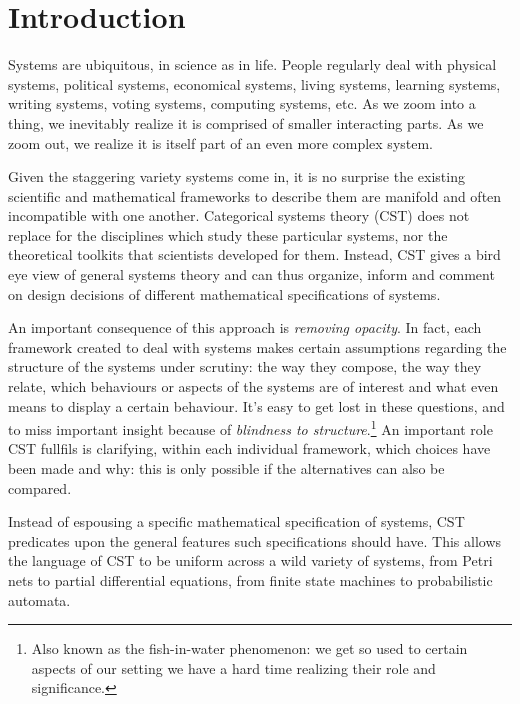 
\section{Introduction}
Systems are ubiquitous, in science as in life.
People regularly deal with physical systems, political systems, economical systems, living systems, learning systems, writing systems, voting systems, computing systems, etc.
As we zoom into a thing, we inevitably realize it is comprised of smaller interacting parts. As we zoom out, we realize it is itself part of an even more complex system.

Given the staggering variety systems come in, it is no surprise the existing scientific and mathematical frameworks to describe them are manifold and often incompatible with one another.
Categorical systems theory (CST) does not replace for the disciplines which study these particular systems, nor the theoretical toolkits that scientists developed for them.
Instead, CST gives a bird eye view of general systems theory and can thus organize, inform and comment on design decisions of different mathematical specifications of systems.


An important consequence of this approach is \emph{removing opacity}.
In fact, each framework created to deal with systems makes certain assumptions regarding the structure of the systems under scrutiny: the way they compose, the way they relate, which behaviours or aspects of the systems are of interest and what even means to display a certain behaviour.
It's easy to get lost in these questions, and to miss important insight because of \emph{blindness to structure}.\footnote{Also known as the fish-in-water phenomenon: we get so used to certain aspects of our setting we have a hard time realizing their role and significance.}
An important role CST fullfils is clarifying, within each individual framework, which choices have been made and why: this is only possible if the alternatives can also be compared.

Instead of espousing a specific mathematical specification of systems, CST predicates upon the general features such specifications should have.
This allows the language of CST to be uniform across a wild variety of systems, from Petri nets to partial differential equations, from finite state machines to probabilistic automata.

